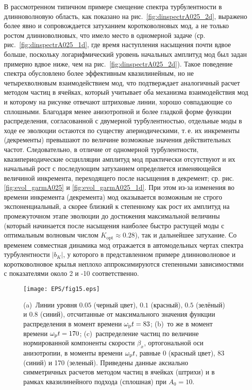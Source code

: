 В рассмотренном типичном примере смещение спектра турбулентности в длинноволновую область, как показано на рис.~\ref{fig:dinspectrA025_2d}, выражено более явно и сопровождается затуханием коротковолновых мод, а не только ростом длинноволновых, что имело место в одномерной задаче (ср. рис.~\ref{fig:dinspectrA025_1d}, где время наступления насыщения почти вдвое больше, поскольку логарифмический уровень начальных амплитуд мод был задан примерно вдвое ниже, чем на рис.~\ref{fig:dinspectrA025_2d}). Такое поведение спектра обусловлено более эффективным квазилинейным, но не четырехволновым взаимодействием мод, что подтверждает аналогичный расчет методом частиц в ячейках, который учитывает оба механизма взаимодействия мод и которому на рисунке отвечают штриховые линии, хорошо совпадающие со сплошными. Благодаря менее анизотропной и более гладкой форме функции распределения, согласованной с двумерной турбулентностью, отдельные моды в ходе ее эволюции остаются по существу апериодическими, т.\,е. их инкременты (декременты) превышают по величине возможные значения действительных частот. Следовательно, в отличие от одномерной турбулентности, квазипериодические осцилляции амплитуд мод практически отсутствуют и их начальный рост с последующим затуханием определяется изменяющейся величиной инкремента, переходящего после насыщения в декремент; ср. рис. \ref{fig:evol_garmA025} и \ref{fig:evol_garmA025_1d}. При этом из-за изменения во времени инкремента (декремента) мод оказывается возможным не строго экспоненциальный, а скорее близкий к степенному как рост их амплитуд на промежуточном этапе эволюции до достижения максимальной величины (который начинается после насыщения наиболее быстро растущей моды с оптимальным волновым числом $K_\mathrm{opt}\approx0.28$), так и дальнейшее затухание. Со временем совместная динамика мод отражается в автомодельных чертах спектра турбулентности $|b_K|$, у которого в представленном примере длинноволновое и коротковолновое крылья неплохо аппроксимируются степенными зависимостями с показателями около 2 и -10 соответственно.
\begin{figure}[t]   
\centering
\texttt{[image: EPS/fig15.eps]}
\caption{(a)~Линии уровня $0.05$ (черный цвет), $0.1$ (красный), $0.5$ (зелёный) и $0.8$ (синий), отсчитанные от максимального значения функции распределения в момент времени $\omega_\mathrm{p} t =83$; (b)~то же в момент времени $\omega_\mathrm{p} t =170$; (c)~распределение частиц по величине нормированной компоненты скорости $\beta_x$, ортогональной оси анизотропии, в моменты времени $\omega_\mathrm{p} t$, равные 0 (красный цвет), 83 (синий) и 170 (зеленый). Приведены данные аксиально симметричных расчетов методом частиц в ячейках (штрихи) и в рамках квазилинейного подхода (сплошная) при $A_0=10$.
}
\label{fig:sravnenie_FR2dax_3im}
\end{figure}

